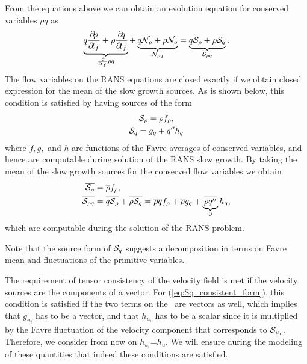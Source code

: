 {From the equations above we can obtain an evolution equation for conserved
variables $\rho q$ as
%
\begin{gather}
  \underbrace{q \frac{\partial\!{\rho}}{\partial\!{t_f}}     + \rho  \frac{\partial\!{q}}{\partial\!{t_f}}     }_{\frac{\partial\!{}}{\partial\!{t_f}}\rho q}
+ \underbrace{q \mathcal{N}_{\rho} + \rho  \mathcal{N}_{q} }_{\mathcal{N}_{\rho q} }
= \underbrace{q \mathcal{S}_{\rho}        + \rho  \mathcal{S}_{q}        }_{\mathcal{S}_{\rho q}}
.
\end{gather}
%
The flow variables on the RANS equations are closed exactly if we obtain closed expression for the
mean of the slow growth sources.  As is shown
below, this condition is satisfied by having sources of the form
%
\begin{gather}
\label{eq:Srho_consistent_form}
\Ssd_{\rho} = \rho f_{\rho}, \\
\label{eq:Sq_consistent_form}
\Ssd_{q}  = g_{q} + \ffluc{q} h_{q}
%
\end{gather}
%
where $f, g,$ and $h$ are functions of the Favre averages of conserved
variables, and hence are computable during solution of the RANS slow
growth. By taking the mean of the slow growth sources for the conserved
flow variables we obtain
%
\begin{align}
\overline{\mathcal{S}_{\rho}}
&= \overline{\rho}  f_\rho, \notag \\
\overline{\mathcal{S}_{\rho q}}
&= \overline{q \mathcal{S}_{\rho}}    + \overline{\rho  \mathcal{S}_{q}} \notag
 = \overline{\rho q}  f_{\rho} + \overline{\rho} g_{q}
   + \underbrace{\overline{\rho q''}}_{0}  h_{q}, \notag
\end{align}
%
which are computable during the solution of the RANS problem.

Note that the source form of $\mathcal{S}_{q}$ suggests a decomposition in terms on
Favre mean and fluctuations of the primitive variables.
%

The requirement of tensor consistency of the velocity field is met if the velocity sources
are the components of a vector. For (\ref{eq:Sq_consistent_form}), this
condition is satisfied if the two terms on the \rhs~are vectors as well, which
implies that $g_{u_i}$ has to be a vector, and that $h_{u_i}$ has to be a
scalar since it is multiplied by the Favre fluctuation of the velocity
component that corresponds to $\mathcal{S}_{u_i}$. Therefore, we consider from now on
$h_{u_i}$=$h_u$. We will ensure during the modeling of these quantities that
indeed these conditions are satisfied.

}
